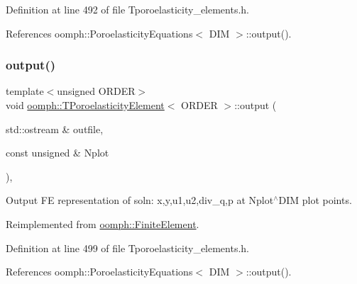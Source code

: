 Definition at line 492 of file Tporoelasticity\+\_\+elements.\+h.



References oomph\+::\+Poroelasticity\+Equations$<$ D\+I\+M $>$\+::output().

\mbox{\label{classoomph_1_1TPoroelasticityElement_a9cf04cdc0ef6d649dd0dc1c8d954dc4b}} 
\subsubsection{\texorpdfstring{output()}{output()}\hspace{0.1cm}{\footnotesize\ttfamily [2/2]}}
{\footnotesize\ttfamily template$<$unsigned O\+R\+D\+ER$>$ \\
void \hyperlink{classoomph_1_1TPoroelasticityElement}{oomph\+::\+T\+Poroelasticity\+Element}$<$ O\+R\+D\+ER $>$\+::output (\begin{DoxyParamCaption}\item[{std\+::ostream \&}]{outfile,  }\item[{const unsigned \&}]{Nplot }\end{DoxyParamCaption})\hspace{0.3cm}{\ttfamily [inline]}, {\ttfamily [virtual]}}



Output FE representation of soln\+: x,y,u1,u2,div\+\_\+q,p at Nplot$^\wedge$\+D\+IM plot points. 



Reimplemented from \hyperlink{classoomph_1_1FiniteElement_afa9d9b2670f999b43e6679c9dd28c457}{oomph\+::\+Finite\+Element}.



Definition at line 499 of file Tporoelasticity\+\_\+elements.\+h.



References oomph\+::\+Poroelasticity\+Equations$<$ D\+I\+M $>$\+::output().

\mbox{\label{classoomph_1_1TPoroelasticityElement_a4c1290c4e7fd01b244ec46728e5c47f1}} 
